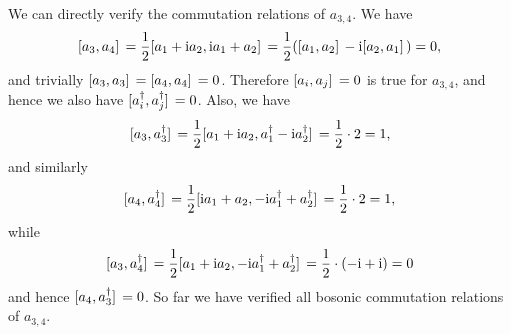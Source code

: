 \documentclass[hyperref, a4paper]{article}
\newcommand*{\ii}{\mathrm{i}}
\begin{document}
We can directly verify the commutation relations of $a_{3,4}$.
We have 
\begin{equation}
    \comm*{a_3}{a_4} = \frac{1}{2} \comm*{a_1 + \ii a_2}{\ii a_1 + a_2}
    = \frac{1}{2} (\comm*{a_1}{a_2} - \ii \comm*{a_2}{a_1}) = 0,
\end{equation}
and trivially $\comm*{a_3}{a_3} = \comm*{a_4}{a_4} = 0$.
Therefore $\comm*{a_i}{a_j} = 0$ is true for $a_{3,4}$, 
and hence we also have $\comm*{a_i^\dagger}{a_j^\dagger} = 0$.
Also, we have 
\begin{equation}
    \comm*{a_3}{a_3^\dagger} = \frac{1}{2} \comm*{a_1 + \ii a_2}{a_1^\dagger - \ii a_2^\dagger}
    = \frac{1}{2} \cdot 2 = 1, 
\end{equation}
and similarly 
\begin{equation}
    \comm*{a_4}{a_4^\dagger} = \frac{1}{2} \comm*{\ii a_1 + a_2}{- \ii a_1^\dagger + a_2^\dagger}
    = \frac{1}{2} \cdot 2 = 1,
\end{equation}
while 
\begin{equation}
    \comm*{a_3}{a_4^\dagger} = \frac{1}{2} \comm*{a_1 + \ii a_2}{- \ii a_1^\dagger + a_2^\dagger}
    = \frac{1}{2} \cdot (- \ii + \ii) = 0
\end{equation}
and hence $\comm*{a_4}{a_3^\dagger} = 0$.
So far we have verified all bosonic commutation relations of $a_{3,4}$.
\end{document}
